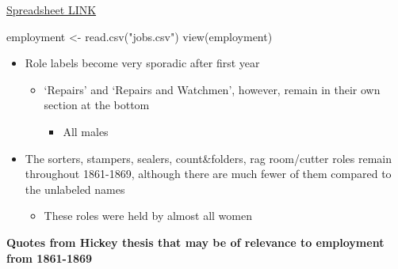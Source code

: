 \documentclass[
  letterpaper,
  DIV=11,
  numbers=noendperiod]{scrartcl}
\newenvironment{Shaded}{\begin{snugshade}}{\end{snugshade}}
\newcommand{\FunctionTok}[1]{\textcolor[rgb]{0.28,0.35,0.67}{#1}}
\newcommand{\NormalTok}[1]{\textcolor[rgb]{0.00,0.23,0.31}{#1}}
\newcommand{\OtherTok}[1]{\textcolor[rgb]{0.00,0.23,0.31}{#1}}
\newcommand{\StringTok}[1]{\textcolor[rgb]{0.13,0.47,0.30}{#1}}
\providecommand{\tightlist}{%
  \setlength{\itemsep}{0pt}\setlength{\parskip}{0pt}}\usepackage{longtable,booktabs,array}
\begin{document}
\href{https://docs.google.com/spreadsheets/d/1dza87xBB2pgVajOuLYBM_fHfAobr6IFIZFAu4vFOnhs/edit?usp=sharing}{Spreadsheet
LINK}

\begin{Shaded}
\begin{Highlighting}[]
\NormalTok{employment }\OtherTok{\textless{}{-}} \FunctionTok{read.csv}\NormalTok{(}\StringTok{"jobs.csv"}\NormalTok{)}
\FunctionTok{view}\NormalTok{(employment)}
\end{Highlighting}
\end{Shaded}

\begin{itemize}
\item
  Role labels become very sporadic after first year

  \begin{itemize}
  \item
    `Repairs' and `Repairs and Watchmen', however, remain in their own
    section at the bottom

    \begin{itemize}
    \tightlist
    \item
      All males
    \end{itemize}
  \end{itemize}
\item
  The sorters, stampers, sealers, count\&folders, rag room/cutter roles
  remain throughout 1861-1869, although there are much fewer of them
  compared to the unlabeled names

  \begin{itemize}
  \tightlist
  \item
    These roles were held by almost all women
  \end{itemize}
\end{itemize}

\textbf{Quotes from Hickey thesis that may be of relevance to employment
from 1861-1869}
\end{document}
